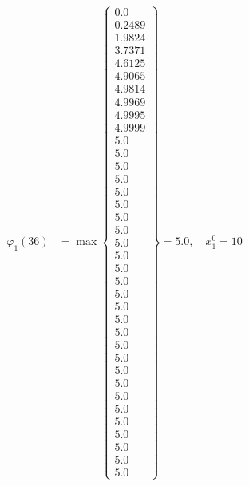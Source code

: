 \documentclass{article}
\begin{document}
\begin{align*}
  
\varphi_{1}(36) &= \max \left\{ \begin{array}{c}
0.0 \\
 0.2489 \\
 1.9824 \\
 3.7371 \\
 4.6125 \\
 4.9065 \\
 4.9814 \\
 4.9969 \\
 4.9995 \\
 4.9999 \\
 5.0 \\
 5.0 \\
 5.0 \\
 5.0 \\
 5.0 \\
 5.0 \\
 5.0 \\
 5.0 \\
 5.0 \\
 5.0 \\
 5.0 \\
 5.0 \\
 5.0 \\
 5.0 \\
 5.0 \\
 5.0 \\
 5.0 \\
 5.0 \\
 5.0 \\
 5.0 \\
 5.0 \\
 5.0 \\
 5.0 \\
 5.0 \\
 5.0 \\
 5.0 \\
 5.0
\end{array} \right\}=5.0,\quad x_{1}^0=10\\
  
  
\end{align*}
\end{document}
